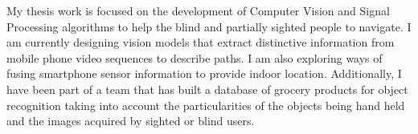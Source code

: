 My thesis work is focused on the development of Computer Vision and Signal Processing algorithms to help the blind and partially sighted people to navigate.
I am currently designing vision models that extract distinctive information from mobile phone video sequences to describe paths. I am also exploring ways of fusing smartphone sensor information to provide indoor location. Additionally, I have been part of a team that has built a database of grocery products for object recognition taking into account the particularities of the objects being hand held and the images acquired by sighted or blind users.
